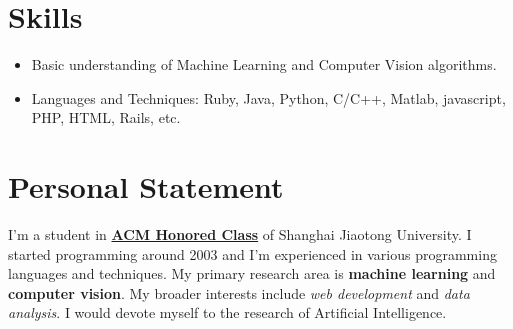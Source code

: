 \documentclass[letterpaper]{article}
\begin{document}
\section*{Skills}
\begin{itemize}
\item Basic understanding of Machine Learning and Computer Vision algorithms.
\item Languages and Techniques: Ruby, Java, Python, C/C++, Matlab, javascript, PHP, HTML, Rails, etc.
\end{itemize}

\section*{Personal Statement}
I'm a student in \textbf{\href{http://acm.sjtu.edu.cn}{ACM Honored Class}} of Shanghai Jiaotong University.
I started programming around 2003 and I'm experienced in various programming languages and techniques.
My primary research area is \textbf{machine learning} and \textbf{computer vision}.
My broader interests include {\it web development} and {\it data analysis}.
I would devote myself to the research of Artificial Intelligence.
\end{document}
